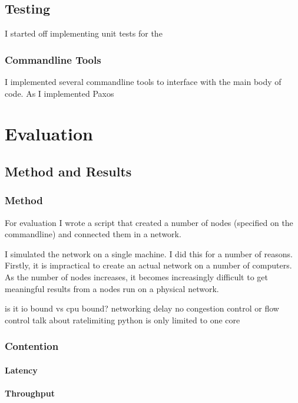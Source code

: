 \documentclass[12pt,twoside,notitlepage]{report}
\begin{document}
\section{Testing}

I started off implementing unit tests for the

\subsection{Commandline Tools}

I implemented several commandline tools to interface with the main body of code. As I implemented
Paxos

\cleardoublepage
\chapter{Evaluation}

\section{Method and Results}

\subsection{Method}

For evaluation I wrote a script that created a number of nodes (specified on the commandline)
and connected them in a network.

I simulated the network on a single machine. I did this for a number of reasons. Firstly, it is
impractical to create an actual network on a number of computers. As the number of nodes
increases, it becomes increasingly difficult to get meaningful results from a nodes run on a
physical network. 

is it io bound vs cpu bound?
networking delay
no congestion control or flow control
talk about ratelimiting
python is only limited to one core

\subsection{Contention}

\subsubsection{Latency}

\subsubsection{Throughput}
\end{document}
